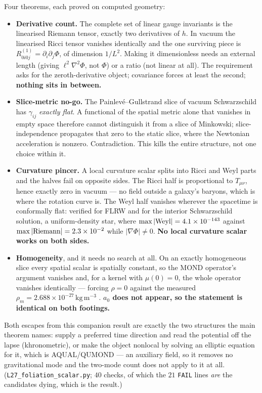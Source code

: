 \documentclass[11pt,letterpaper]{article}
\begin{document}
Four theorems, each proved on computed geometry:
\begin{itemize}\itemsep2pt
\item \textbf{Derivative count.} The complete set of linear gauge invariants is the linearised Riemann tensor, exactly two derivatives of $h$. In vacuum the linearised Ricci tensor vanishes identically and the one surviving piece is $R^{(1)}_{0i0j}=\partial_i\partial_j\Phi$, of dimension $1/L^2$. Making it dimensionless needs an external length (giving $\ell^2\nabla^2\Phi$, not $\Phi$) or a ratio (not linear at all). The requirement asks for the zeroth-derivative object; covariance forces at least the second; \textbf{nothing sits in between.}
\item \textbf{Slice-metric no-go.} The Painlev\'e--Gullstrand slice of vacuum Schwarzschild has $\gamma_{ij}$ \emph{exactly flat}. A functional of the spatial metric alone that vanishes in empty space therefore cannot distinguish it from a slice of Minkowski; slice-independence propagates that zero to the static slice, where the Newtonian acceleration is nonzero. Contradiction. This kills the entire structure, not one choice within it.
\item \textbf{Curvature pincer.} A local curvature scalar splits into Ricci and Weyl parts and the halves fail on opposite sides. The Ricci half is proportional to $T_{\mu\nu}$, hence exactly zero in vacuum --- no field outside a galaxy's baryons, which is where the rotation curve is. The Weyl half vanishes wherever the spacetime is conformally flat: verified for FLRW and for the interior Schwarzschild solution, a uniform-density star, where $\max|{\rm Weyl}|=4.1\times10^{-143}$ against $\max|{\rm Riemann}|=2.3\times10^{-2}$ while $|\nabla\Phi|\neq0$. \textbf{No local curvature scalar works on both sides.}
\item \textbf{Homogeneity}, and it needs no search at all. On an exactly homogeneous slice every spatial scalar is spatially constant, so the MOND operator's argument vanishes and, for a kernel with $\mu(0)=0$, the whole operator vanishes identically --- forcing $\rho=0$ against the measured $\rho_m=2.688\times10^{-27}\,\mathrm{kg\,m^{-3}}$ \cite{Planck2020}. \textbf{$a_0$ does not appear, so the statement is identical on both footings.}
\end{itemize}
Both escapes from this companion result are exactly the two structures the main theorem names: supply a preferred time direction and read the potential off the lapse (khronometric), or make the object nonlocal by solving an elliptic equation for it, which is AQUAL/QUMOND --- an auxiliary field, so it removes no gravitational mode and the two-mode count does not apply to it at all. (\texttt{L27\_foliation\_scalar.py}; $40$ checks, of which the $21$ \texttt{FAIL} lines \emph{are} the candidates dying, which is the result.)
\end{document}
